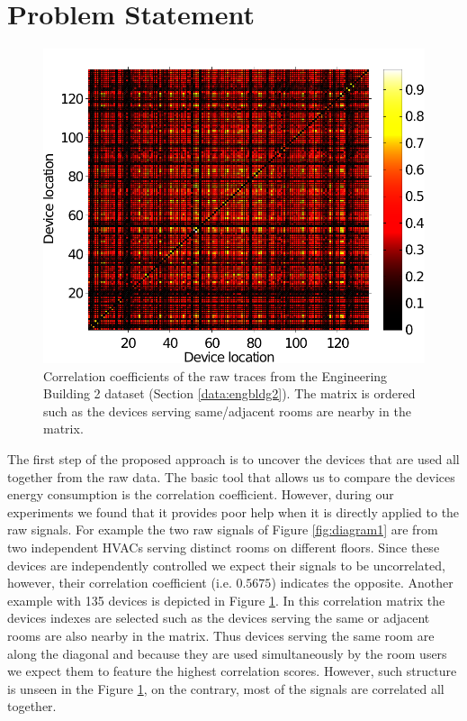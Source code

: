 \section{Problem Statement}
\begin{figure}
\begin{center}
\includegraphics[width=.45\textwidth]{img/heatMap_raw_201106-eps-converted-to.pdf}
\caption{Correlation coefficients of the raw traces from the Engineering Building 2 dataset (Section \ref{data:engbldg2}).
The matrix is ordered such as the devices serving same/adjacent rooms are nearby in the matrix.}
\label{fig:heatmap:raw}
\end{center}
\end{figure}

The first step of the proposed approach is to uncover the devices that are used all together from the raw data.
The basic tool that allows us to compare the devices energy consumption is the correlation coefficient.
However, during our experiments we found that it provides poor help when it is directly applied to the raw signals.
For example the two raw signals of Figure \ref{fig:diagram1} are from two independent HVACs serving distinct rooms on different floors.
Since these devices are independently controlled we expect their signals to be uncorrelated, however, their correlation coefficient (i.e. $0.5675$) indicates the opposite.
Another example with 135 devices is depicted in Figure \ref{fig:heatmap:raw}.
In this correlation matrix the devices indexes are selected such as the devices serving the same or adjacent rooms are also nearby in the matrix.
Thus devices serving the same room are along the diagonal and because they are used simultaneously by the room users we expect them to feature the highest correlation scores.
However, such structure is unseen in the Figure \ref{fig:heatmap:raw}, on the contrary, most of the signals are correlated all together.

